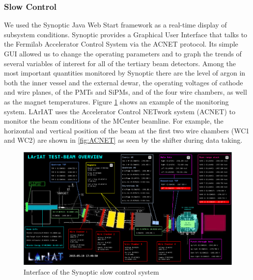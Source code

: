 \subsubsection{Slow Control}
We used the Synoptic Java Web Start framework \cite{Synoptic} as a real-time display of subsystem conditions. Synoptic provides a Graphical User Interface that talks to the Fermilab Accelerator Control System via the ACNET protocol. Its simple GUI allowed us to change the operating parameters and to graph the trends of several variables of interest for all of the tertiary beam detectors.  Among the most important quantities monitored by Synoptic there are the level of argon in both the inner vessel and the external dewar, the operating voltages of cathode and wire planes, of the PMTs and SiPMs, and of the four wire chambers, as well as the magnet temperatures. Figure \ref{fig:synoptics} shows an example of the monitoring system.
LArIAT uses the Accelerator Control NETwork system (ACNET) to monitor the beam conditions of the MCenter beamline. For example, the horizontal and vertical position of the beam at the first two wire chambers (WC1 and WC2) are shown in \ref{fig:ACNET} as seen by the shifter during data taking. 

\begin{figure}[htb]
\centering
\includegraphics[width=\textwidth,height=\textheight,keepaspectratio]{Chapter-3/Images/BeamOverview.png}
\caption{Interface of the Synoptic slow control system}
\label{fig:synoptics}
\end{figure}

